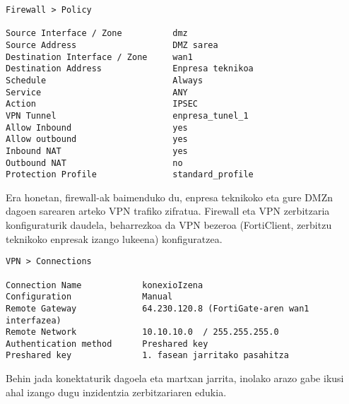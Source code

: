 \begin{verbatim}
Firewall > Policy

Source Interface / Zone          dmz
Source Address                   DMZ sarea
Destination Interface / Zone     wan1
Destination Address              Enpresa teknikoa
Schedule                         Always
Service                          ANY
Action                           IPSEC
VPN Tunnel                       enpresa_tunel_1
Allow Inbound                    yes
Allow outbound                   yes
Inbound NAT                      yes
Outbound NAT                     no
Protection Profile               standard_profile
\end{verbatim}

Era honetan, firewall-ak baimenduko du, enpresa teknikoko eta gure DMZn dagoen sarearen arteko VPN trafiko zifratua. Firewall eta VPN zerbitzaria konfiguraturik daudela, beharrezkoa da VPN bezeroa (FortiClient, zerbitzu teknikoko enpresak izango lukeena) konfiguratzea.

\begin{verbatim}
VPN > Connections

Connection Name            konexioIzena
Configuration              Manual
Remote Gateway             64.230.120.8 (FortiGate-aren wan1 interfazea)
Remote Network             10.10.10.0  / 255.255.255.0 
Authentication method      Preshared key 
Preshared key              1. fasean jarritako pasahitza
\end{verbatim}

Behin jada konektaturik dagoela eta martxan jarrita, inolako arazo gabe ikusi ahal izango dugu inzidentzia zerbitzariaren edukia.




 